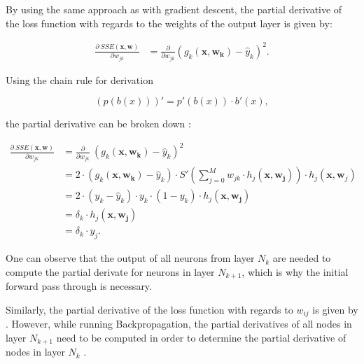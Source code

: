 By using the same approach as with gradient descent, the partial derivative of the loss function with regards to the weights of the output layer is given by:

\begin{equation}
    \begin{split}
        \frac{\partial ~ SSE(\bm{x}, \bm{w})}{\partial w_{jk}}
        &= \frac{\partial}{\partial w_{jk}} (g_k(\bm{x},\bm{w_k}) - \hat{y}_{k})^2.
    \end{split}
\end{equation}

Using the chain rule for derivation

\begin{equation}
    (p(b(x)))' = p'(b(x)) \cdot b'(x),
\end{equation}

the partial derivative can be broken down :

\begin{equation}
    \label{eq:vanishing_1}
    \begin{split}
        \frac{\partial ~ SSE(\bm{x}, \bm{w})}{\partial w_{jk}}
        &= \frac{\partial}{\partial w_{jk}} ~ (g_k(\bm{x},\bm{w_k}) - \hat{y}_{k})^2 \\
        &= 2 \cdot (g_k(\bm{x},\bm{w_k}) - \hat{y}_{k}) \cdot  S'\left(\sum_{j=0}^M w_{jk} \cdot h_j(\bm{x}, \bm{w_j})\right) \cdot h_j(\bm{x}, \bm{w}_j) \\
        &= 2 \cdot (y_k - \hat{y}_{k}) \cdot  y_k \cdot (1 - y_k) \cdot h_j(\bm{x}, \bm{w_j}) \\
        &= \delta_k \cdot h_j(\bm{x}, \bm{w_j}) \\
        &= \delta_k \cdot y_j.
    \end{split}
\end{equation}

One can observe that the output of all neurons from layer $N_{k}$ are needed to compute the partial derivate for neurons in layer $N_{k+1}$, which is why the initial forward pass through is necessary.

Similarly, the partial derivative of the loss function with regards to $w_{ij}$ is given by .
However, while running Backpropagation, the partial derivatives of all nodes in layer $N_{k+1}$ need to be computed in order to determine the partial derivative of nodes in layer $N_{k}$ \cite{rojas_neural_1996}.

